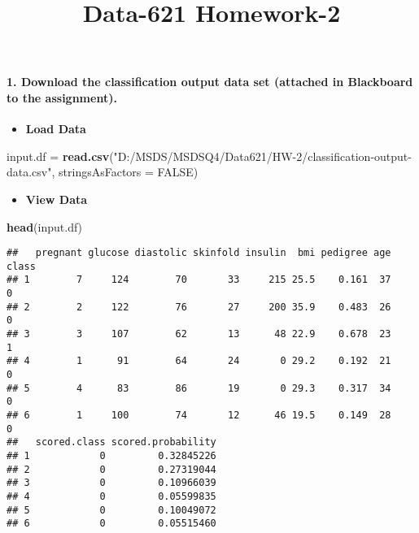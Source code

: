 \documentclass[]{article}
\title{Data-621 Homework-2}
\author{}
\date{}
\newenvironment{Shaded}{\begin{snugshade}}{\end{snugshade}}
\newcommand{\DataTypeTok}[1]{\textcolor[rgb]{0.13,0.29,0.53}{#1}}
\newcommand{\KeywordTok}[1]{\textcolor[rgb]{0.13,0.29,0.53}{\textbf{#1}}}
\newcommand{\NormalTok}[1]{#1}
\newcommand{\OtherTok}[1]{\textcolor[rgb]{0.56,0.35,0.01}{#1}}
\newcommand{\StringTok}[1]{\textcolor[rgb]{0.31,0.60,0.02}{#1}}
\providecommand{\tightlist}{%
  \setlength{\itemsep}{0pt}\setlength{\parskip}{0pt}}
\let\oldparagraph\paragraph
\renewcommand{\paragraph}[1]{\oldparagraph{#1}\mbox{}}
\begin{document}
\maketitle

\hypertarget{download-the-classification-output-data-set-attached-in-blackboard-to-the-assignment.}{%
\paragraph{1. Download the classification output data set (attached in
Blackboard to the
assignment).}\label{download-the-classification-output-data-set-attached-in-blackboard-to-the-assignment.}}

\begin{itemize}
\tightlist
\item
  \textbf{Load Data}
\end{itemize}

\begin{Shaded}
\begin{Highlighting}[]
\NormalTok{input.df =}\StringTok{ }\KeywordTok{read.csv}\NormalTok{(}\StringTok{"D:/MSDS/MSDSQ4/Data621/HW-2/classification-output-data.csv"}\NormalTok{, }\DataTypeTok{stringsAsFactors =} \OtherTok{FALSE}\NormalTok{)}
\end{Highlighting}
\end{Shaded}

\begin{itemize}
\tightlist
\item
  \textbf{View Data}
\end{itemize}

\begin{Shaded}
\begin{Highlighting}[]
\KeywordTok{head}\NormalTok{(input.df)}
\end{Highlighting}
\end{Shaded}

\begin{verbatim}
##   pregnant glucose diastolic skinfold insulin  bmi pedigree age class
## 1        7     124        70       33     215 25.5    0.161  37     0
## 2        2     122        76       27     200 35.9    0.483  26     0
## 3        3     107        62       13      48 22.9    0.678  23     1
## 4        1      91        64       24       0 29.2    0.192  21     0
## 5        4      83        86       19       0 29.3    0.317  34     0
## 6        1     100        74       12      46 19.5    0.149  28     0
##   scored.class scored.probability
## 1            0         0.32845226
## 2            0         0.27319044
## 3            0         0.10966039
## 4            0         0.05599835
## 5            0         0.10049072
## 6            0         0.05515460
\end{verbatim}
\end{document}
